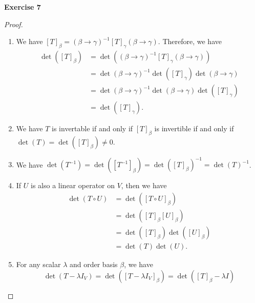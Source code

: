 \documentclass[12pt, a4paper]{article}
\theoremstyle{plain}
\newenvironment{exercise}[2][Exercise]
    { \begin{mdframed}[backgroundcolor=gray!20] \textbf{#1 #2} \\}
    {  \end{mdframed}}
\begin{document}
\begin{exercise}{7}
\end{exercise}
\begin{proof}
\hfill
\begin{enumerate}[label=(\alph*)]
\item We have $[T]_\beta = (\beta\rightarrow\gamma)^{-1}[T]_\gamma(\beta\rightarrow\gamma)$. Therefore, we have
\begin{align*}
\det([T]_\beta) &= \det((\beta\rightarrow\gamma)^{-1}[T]_\gamma(\beta\rightarrow\gamma))\\
&=\det(\beta\rightarrow\gamma)^{-1}\det([T]_\gamma)\det(\beta\rightarrow\gamma)\\
&=\det(\beta\rightarrow\gamma)^{-1}\det(\beta\rightarrow\gamma)\det([T]_\gamma)\\
&=\det([T]_\gamma).
\end{align*}

\item We have $T$ is invertable if and only if $[T]_\beta$ is invertible if and only if $\det(T)=\det([T]_\beta)\neq 0$.

\item We have $\det(T^{-1})=\det([T^{-1}]_\beta)=\det([T]_\beta)^{-1}=\det(T)^{-1}$.

\item If $U$ is also a linear operator on $V$, then we have 
\begin{align*}
\det(T\circ U)&=\det([T\circ U]_\beta)\\
&=\det([T]_\beta [U]_\beta)\\
&=\det([T]_\beta)\det([U]_\beta)\\
&=\det(T)\det(U).
\end{align*}

\item For any scalar $\lambda$ and order basis $\beta$, we have
\[
\det(T-\lambda I_V)=\det([T-\lambda I_V]_\beta) = \det([T]_\beta - \lambda I)
\]

\end{enumerate}
\end{proof}
\end{document}
